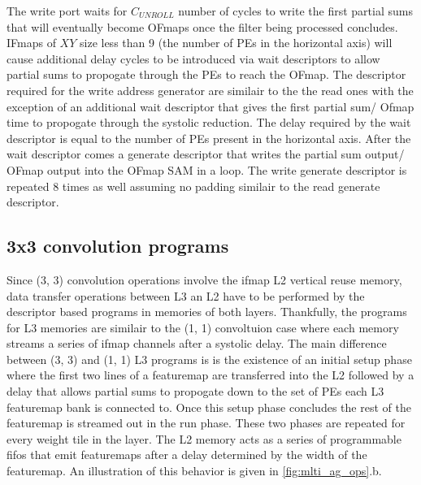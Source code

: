 The write port waits for $C_{UNROLL}$ number of cycles to write the first
partial sums that will eventually become OFmaps once the filter being processed
concludes. IFmaps of $XY$ size less than 9 (the number of PEs in the horizontal
axis) will cause additional delay cycles to be introduced via wait descriptors
to allow partial sums to propogate through the PEs to reach the OFmap.
 The descriptor required for
the write address generator are similair to the the read ones with the exception
of an additional wait descriptor that gives the first partial sum/ Ofmap time to
propogate through the systolic reduction. The delay required by the wait
descriptor is equal to the number of PEs present in the horizontal axis. After
the wait descriptor comes a generate descriptor that writes the partial sum
output/ OFmap output into the OFmap SAM in a loop. The write generate
descriptor is repeated 8 times as well assuming no padding similair to
the read generate descriptor.

\subsection{3x3 convolution programs}
\label{chap:sams:acc_scheduling:3x3}

Since (3, 3) convolution operations involve the ifmap L2 vertical reuse memory,
data transfer operations between L3 an L2 have to be performed by the descriptor
based programs in memories of both layers. Thankfully, the programs for L3
memories are similair to the (1, 1) convoltuion case where each memory streams a
series of ifmap channels after a systolic delay. The main difference between (3, 3)
and (1, 1) L3 programs is is the existence of an initial setup phase where the
first two lines of a featuremap are transferred into the L2 followed by a delay
that allows partial sums to propogate down to the set of PEs each L3 featuremap
bank is connected to. Once this setup phase concludes the rest of the
featuremap is streamed out in the run phase. These two phases are repeated for every
weight tile in the layer. The L2 memory acts as a series of programmable fifos
that emit featuremaps after a delay determined by the width of the featuremap.
An illustration of this behavior is given in \autoref{fig:mlti_ag_ops}.b. 


